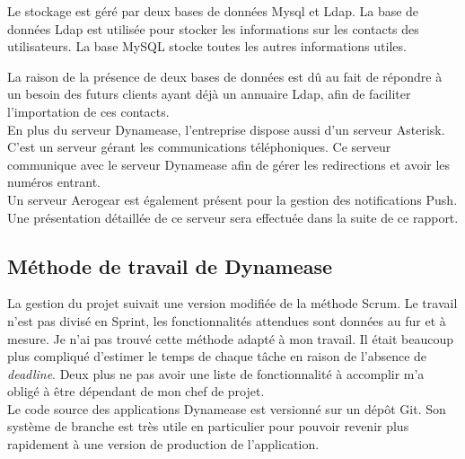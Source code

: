 Le stockage est géré par deux bases de données Mysql et Ldap. La base de données Ldap est utilisée pour stocker les informations sur les contacts des utilisateurs. La base MySQL stocke toutes les autres informations utiles.

La raison de la présence de deux bases de données est dû au fait de répondre à un besoin des futurs clients ayant déjà un annuaire Ldap, afin de faciliter l'importation de ces contacts.\\

En plus du serveur Dynamease, l'entreprise dispose aussi d'un serveur Asterisk. C'est un serveur gérant les communications téléphoniques. Ce serveur communique avec le serveur Dynamease afin de gérer les redirections et avoir les numéros entrant.\\

Un serveur Aerogear est également présent pour la gestion des notifications Push. Une présentation détaillée de ce serveur sera effectuée dans la suite de ce rapport.

\subsection{Méthode de travail de Dynamease}

La gestion du projet suivait une version modifiée de la méthode Scrum. Le travail n'est pas divisé en Sprint, les fonctionnalités attendues sont données au fur et à mesure. Je n'ai pas trouvé cette méthode adapté à mon travail. Il était beaucoup plus compliqué d'estimer le temps de chaque tâche en raison de l'absence de \textit{deadline}. Deux plus ne pas avoir une liste de fonctionnalité à accomplir m'a obligé à être dépendant de mon chef de projet.\\

Le code source des applications Dynamease est versionné sur un dépôt Git. Son système de branche est très utile en particulier pour pouvoir revenir plus rapidement à une version de production de l'application.